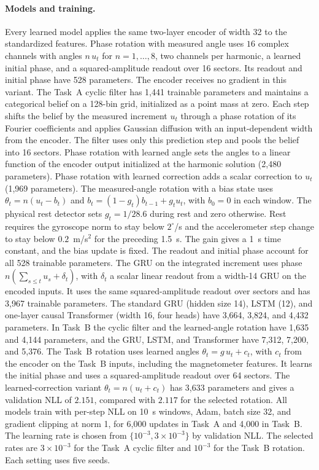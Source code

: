 \paragraph{Models and training.}
Every learned model applies the same two-layer encoder of width 32 to the
standardized features. Phase rotation with measured angle uses $16$ complex
channels with angles $n\,u_t$ for $n=1,\dots,8$, two channels per harmonic, a
learned initial phase, and a squared-amplitude readout over 16 sectors. Its
readout and initial phase have 528 parameters. The encoder receives no gradient
in this variant. The Task~A cyclic filter has 1{,}441 trainable parameters and
maintains a categorical belief on a 128-bin grid, initialized as a point mass
at zero. Each step shifts the belief by the measured increment $u_t$ through a
phase rotation of its Fourier coefficients and applies Gaussian diffusion with
an input-dependent width from the encoder. The filter uses only this prediction
step and pools the belief into 16 sectors. Phase rotation with learned angle
sets the angles to a linear function of the encoder output initialized at the
harmonic solution (2{,}480 parameters). Phase rotation with learned correction
adds a scalar correction to $u_t$ (1{,}969 parameters). The measured-angle
rotation with a bias state uses
$\theta_t=n(u_t-b_t)$ and $b_t=(1-g_t)b_{t-1}+g_tu_t$, with $b_0=0$ in each
window. The physical rest detector sets $g_t=1/28.6$ during rest and zero
otherwise. Rest requires the gyroscope norm to stay below $2^\circ$/s and the
accelerometer step change to stay below $0.2$~m/s$^2$ for the preceding 1.5~s.
The gain gives a 1~s time constant, and the bias update is fixed. The readout
and initial phase account for all 528 trainable parameters. The GRU on the
integrated increment uses phase $n(\sum_{s\le t} u_s + \delta_t)$, with
$\delta_t$ a scalar linear readout from a width-14 GRU on the encoded inputs.
It uses the same squared-amplitude readout over sectors and has 3{,}967
trainable parameters. The standard GRU (hidden size
14), LSTM (12), and one-layer causal Transformer (width 16, four heads) have
3{,}664, 3{,}824, and 4{,}432 parameters. In Task~B the cyclic filter and the
learned-angle rotation have 1{,}635 and 4{,}144 parameters, and the GRU, LSTM,
and Transformer have 7{,}312, 7{,}200, and 5{,}376. The Task~B rotation uses
learned angles $\theta_t=g\,u_t+c_t$, with $c_t$ from the encoder on the
Task~B inputs, including the magnetometer features. It learns the initial
phase and uses a squared-amplitude readout over 64 sectors. The learned-correction
variant $\theta_t=n(u_t+c_t)$ has 3{,}633 parameters and gives a validation NLL
of $2.151$, compared with $2.117$ for the selected rotation.
All models train with per-step NLL on 10~s windows, Adam, batch size 32, and
gradient clipping at norm 1, for 6{,}000 updates in Task~A and 4{,}000 in
Task~B. The learning rate is chosen from $\{10^{-3},3\times10^{-3}\}$ by
validation NLL. The selected rates are $3\times10^{-3}$ for the Task~A cyclic
filter and $10^{-3}$ for the Task~B rotation. Each setting uses five seeds.

